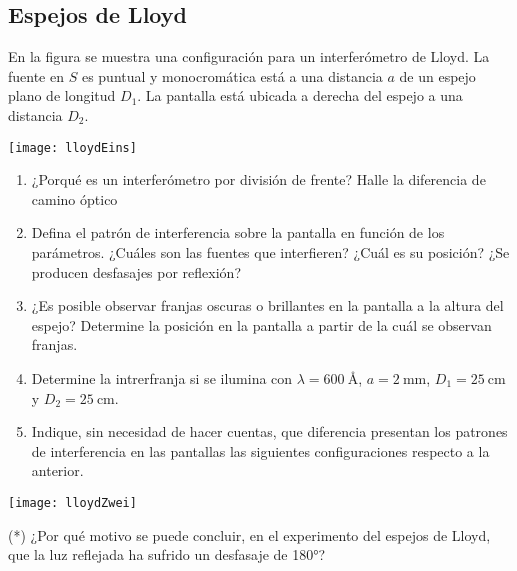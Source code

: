 \subsection*{Espejos de Lloyd}

\item 
\begin{minipage}[t][2.5cm]{0.4\textwidth}
En la figura se muestra una configuración para un interferómetro de Lloyd.
La fuente en \(S\) es puntual y monocromática está a una distancia \(a\) de un espejo plano de longitud \(D_1\).
La pantalla está ubicada a derecha del espejo a una distancia \(D_2\).
\end{minipage}
\begin{minipage}[c][1.5cm][t]{0.55\textwidth}
	\texttt{[image: lloydEins]}
\end{minipage}
\begin{enumerate}
	\item ¿Porqué es un interferómetro por división de frente?
	Halle la diferencia de camino óptico
	\item Defina el patrón de interferencia sobre la pantalla en función de los parámetros.
	¿Cuáles son las fuentes que interfieren?
	¿Cuál es su posición?
	¿Se producen desfasajes por reflexión?
	\item ¿Es posible observar franjas oscuras o brillantes en la pantalla a la altura del espejo?
	Determine la posición en la pantalla a partir de la cuál se observan franjas.
	\item Determine la intrerfranja si se ilumina con \(\lambda = \SI{600}{\angstrom}\), \(a = \SI{2}{\milli\metre}\), \(D_1 = \SI{25}{\centi\metre}\) y \(D_2 = \SI{25}{\centi\metre}\).
	\item Indique, sin necesidad de hacer cuentas, que diferencia presentan los patrones de interferencia en las pantallas las siguientes configuraciones respecto a la anterior.
\end{enumerate}
\texttt{[image: lloydZwei]}


\item (*) ¿Por qué motivo se puede concluir, en el experimento del espejos de Lloyd, que la luz reflejada ha sufrido un desfasaje de \ang{180;;}?
